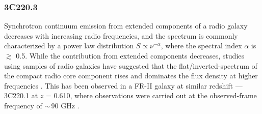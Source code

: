 \documentclass[iop, revtex4]{emulateapj}
\begin{document}
\subsubsection{3C220.3}\label{sec:SEDFg}
Synchrotron continuum emission from extended components of a radio galaxy decreases with increasing radio frequencies,
and the spectrum is commonly characterized by a power law distribution $S \propto \nu^{-\alpha}$, where the
spectral index $\alpha$ is $\gtrsim$ 0.5. While the contribution from extended components decreases, studies using
samples of radio galaxies have suggested that the flat/inverted-spectrum of the compact radio core component rises
and dominates the flux density at higher frequencies \citep{Kellermann81a,Begelman84a}. This has been observed in a FR-II galaxy at similar redshift --- 3C220.1 at $z$ = 0.610, where observations were carried out at the observed-frame frequency of $\sim$\,90 GHz \citep{Hardcastle08a}.
\end{document}
